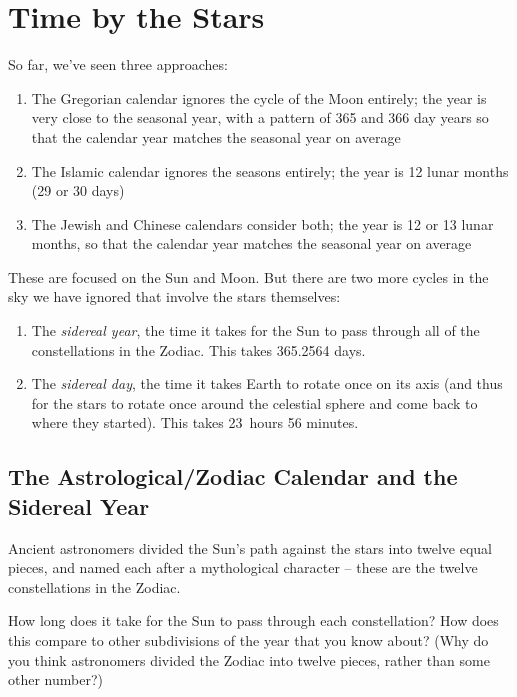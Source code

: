 \documentclass[11pt]{article}
\begin{document}
\vspace{1in}
\underline{\hspace{6in}}

\section{Time by the Stars}

So far, we've seen three approaches:

\begin{enumerate}
	\item The Gregorian calendar ignores the cycle of the Moon entirely; the year is very close to the seasonal year, with a pattern of 365 and 366 day years so that the calendar year matches the seasonal year on average
	\item The Islamic calendar ignores the seasons entirely; the year is 12 lunar months (29 or 30 days)
	\item The Jewish and Chinese calendars consider both; the year is 12 or 13 lunar months, so that the calendar year matches the seasonal year on average
\end{enumerate}

These are focused on the Sun and Moon. But there are two more cycles in the sky we have ignored that involve the stars themselves:
\newpage
\begin{enumerate}
	\item The {\it sidereal year}, the time it takes for the Sun to pass through all of the constellations in the Zodiac. This takes 365.2564 days.
	\item The {\it sidereal day}, the time it takes Earth to rotate once on its axis (and thus for the stars to rotate once around the celestial sphere and come back to where they started). This takes 23~hours 56 minutes.
\end{enumerate}

\subsection{The Astrological/Zodiac Calendar and the Sidereal Year}

Ancient astronomers divided the Sun's path against the stars into twelve equal pieces, and named each after a mythological character -- these are the twelve constellations in the Zodiac.

How long does it take for the Sun to pass through each constellation? How does this compare to other subdivisions of the year that you know about? (Why do you think astronomers divided the Zodiac into twelve pieces, rather than some other number?)
\end{document}
